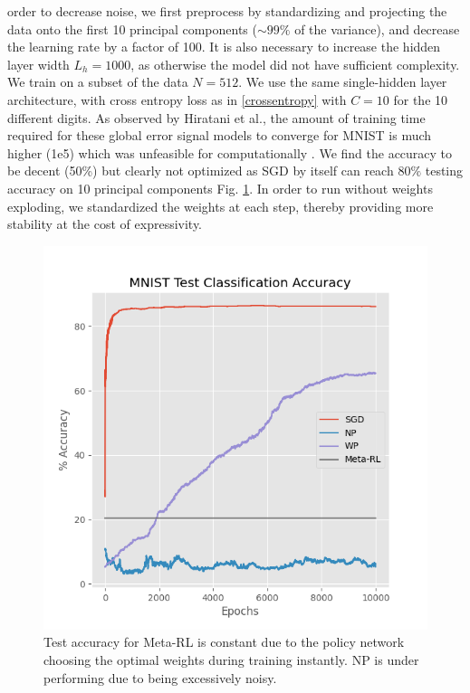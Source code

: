 \documentclass{article}
\begin{document}
order to decrease noise, we first preprocess by standardizing and projecting the
data onto the first 10 principal components ($\sim99\%$ of the variance), and decrease the learning rate 
by a factor of 100. It is also necessary to increase the hidden layer width $L_h = 1000$, as otherwise the model did not
have sufficient complexity. We train on a subset of the data $N=512$. We use the same single-hidden layer architecture, with cross entropy loss as in \ref{crossentropy} with $C=10$ for the 10 different digits. As observed by Hiratani et al., the amount of training time required 
for these global error signal models to converge for MNIST is much higher (1e5) which was unfeasible for computationally \cite{hiratani2022on}.
We find the accuracy to be decent (50\%) but clearly not optimized as SGD by itself can reach $80\%$ testing accuracy on 10
principal components Fig. \ref{fig:mnistacc}. In order to run without weights exploding, we standardized the weights at each step, thereby providing more stability at the cost of expressivity. 

\begin{figure}
  \centering
  \includegraphics[scale=0.6]{acc}  \caption{Test accuracy for Meta-RL is constant due to the policy network choosing the optimal weights during training instantly. NP is under performing due to being excessively noisy.  \label{fig:mnistacc}}
\end{figure}
\end{document}
